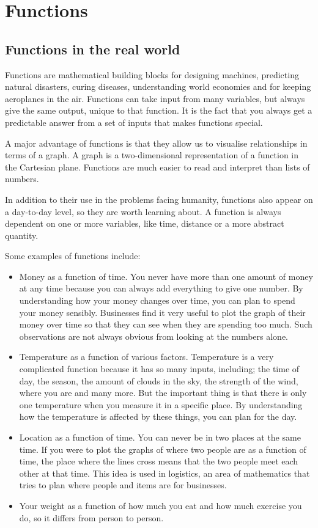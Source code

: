 \chapter{Functions}
\setcounter{figure}{0}
\setcounter{subfigure}{0}

\section{Functions in the real world}
Functions are mathematical building blocks for designing machines, predicting natural disasters, curing diseases, understanding world economies and for keeping aeroplanes in the air. Functions can take input from many variables, but always give the same output, unique to that function. It is the fact that you always get a predictable answer from a set of inputs that makes functions special.\par 
A major advantage of functions is that they allow us to visualise relationships in terms of a graph. A graph is a two-dimensional representation of a function in the Cartesian plane. Functions are much easier to read and interpret than lists of numbers.\par 
In addition to their use in the problems facing humanity, functions also appear on a day-to-day level, so they are worth learning about. A function is always dependent on one or more variables, like time, distance or a more abstract quantity.\par 

Some examples of functions include:\par 
\begin{itemize}[noitemsep]
\item Money as a function of time. You never have more than one amount of money at any time because you can always add everything to give one number. By understanding how your money changes over time, you can plan to spend your money sensibly. Businesses find it very useful to plot the graph of their money over time so that they can see when they are spending too much. Such observations are not always obvious from looking at the numbers alone.
\item Temperature as a function of various factors. Temperature is a very complicated function because it has so many inputs, including; the time of day, the season, the amount of clouds in the sky, the strength of the wind, where you are and many more. But the important thing is that there is only one temperature when you measure it in a specific place. By understanding how the temperature is affected by these things, you can plan
for the day.
\item Location as a function of time. You can never be in two places at the same time. If you were to plot the graphs of where two people are as a function of time, the place where the lines cross means that the two people meet each other at that time. This idea is used in logistics, an area of mathematics that tries to plan where people and items are for businesses.
\item Your weight as a function of how much you eat and how much exercise you do, so it differs from person to person.
\end{itemize}

